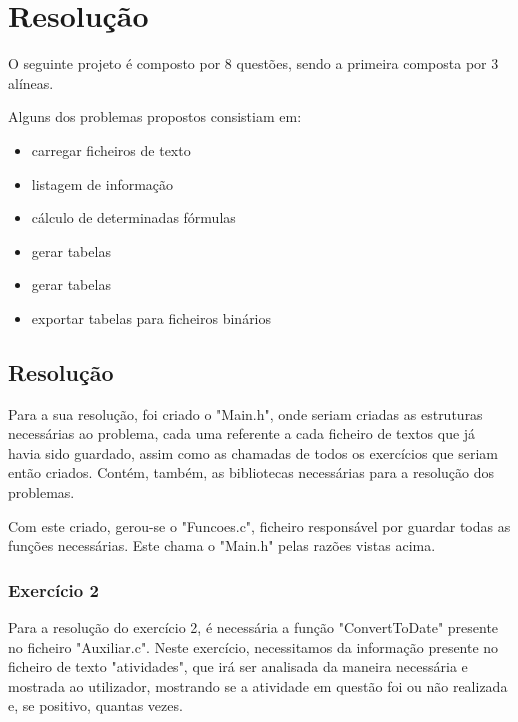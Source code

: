 \chapter{Resolução} \label{chap:sota}

 O seguinte projeto é composto por 8 questões, sendo a primeira composta por 3 alíneas. 

 Alguns dos problemas propostos consistiam em:

\begin{itemize}
	\item carregar ficheiros de texto
	\item listagem de informação
	\item cálculo de determinadas fórmulas
	\item gerar tabelas
	\item gerar tabelas
	\item exportar tabelas para ficheiros binários
\end{itemize}

\section{Resolução}

Para a sua resolução, foi criado o "Main.h", onde seriam criadas as estruturas necessárias ao problema, cada uma referente a cada ficheiro de textos que já havia sido guardado, assim como as chamadas de todos os exercícios que seriam então criados. Contém, também, as bibliotecas necessárias para a resolução dos problemas.

Com este criado, gerou-se o "Funcoes.c", ficheiro responsável por guardar todas as funções necessárias. Este chama o "Main.h" pelas razões vistas acima.

\subsection{Exercício 2}
Para a resolução do exercício 2, é necessária a função "ConvertToDate" presente no ficheiro "Auxiliar.c". Neste exercício, necessitamos da informação presente no ficheiro de texto "atividades", que irá ser analisada da maneira necessária e mostrada ao utilizador, mostrando se a atividade em questão foi ou não realizada e, se positivo, quantas vezes.


